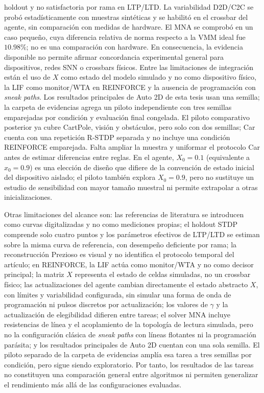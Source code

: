 holdout y no satisfactoria por rama en LTP/LTD. La
variabilidad D2D/C2C se probó estadísticamente con muestras
sintéticas y se habilitó en el crossbar del agente, sin comparación con
medidas de hardware. El MNA se comprobó en un caso pequeño, cuya
diferencia relativa de norma respecto a la VMM ideal fue $10.98\%$; no
es una comparación con hardware. En consecuencia, la evidencia
disponible no permite afirmar concordancia experimental general para
dispositivos, redes SNN o crossbars físicos.
Entre las limitaciones de integración están el uso de $X$ como estado
del modelo simulado y no como dispositivo físico, la LIF como monitor/WTA
en REINFORCE y la ausencia de programación con \textit{sneak paths}. Los
resultados principales de Auto 2D de esta tesis usan una semilla; la carpeta
de evidencias agrega un piloto independiente con tres semillas emparejadas
por condición y evaluación final congelada. El piloto comparativo posterior ya cubre CartPole, visi\'on y obst\'aculos,
pero solo con dos semillas; Car cuenta con una repetici\'on R-STDP separada y
no incluye una condici\'on REINFORCE emparejada. Falta ampliar la muestra y
uniformar el protocolo Car antes de estimar diferencias entre reglas. En el
agente, $X_0=0.1$ (equivalente a $x_0=0.9$) es una elecci\'on de dise\~no que
difiere de la convenci\'on de estado inicial del dispositivo aislado; el
piloto tambi\'en explora $X_0=0.9$, pero no sustituye un estudio de sensibilidad
con mayor tama\~no muestral ni permite extrapolar a otras inicializaciones.

Otras limitaciones del alcance son: las referencias de literatura se
introducen como curvas digitalizadas y no como mediciones propias; el
holdout STDP comprende solo cuatro puntos y los parámetros efectivos de
LTP/LTD se estiman sobre la misma curva de referencia, con desempeño
deficiente por rama; la reconstrucción Prezioso es visual y no identifica
el protocolo temporal del artículo; en REINFORCE, la LIF actúa como
monitor/WTA y no como decisor principal;
la matriz $X$ representa el estado de celdas simuladas, no un crossbar
    físico; las actualizaciones del agente cambian directamente el estado
    abstracto $X$, con límites y variabilidad configurada, sin simular una
    forma de onda de programación ni pulsos discretos por actualización; los
    valores de $\gamma$ y
la actualización de elegibilidad difieren entre tareas; el solver MNA
incluye resistencias de línea y el acoplamiento de la topología de
lectura simulada, pero no la configuración clásica de
\textit{sneak paths} con líneas flotantes ni la programación parásita;
y los resultados principales de Auto 2D cuentan con una sola semilla. El
piloto separado de la carpeta de evidencias amplía esa tarea a tres semillas
por condición, pero sigue siendo exploratorio. Por tanto, los resultados de
las tareas no constituyen una comparación general entre algoritmos ni
permiten generalizar el rendimiento más allá de las configuraciones
evaluadas.

